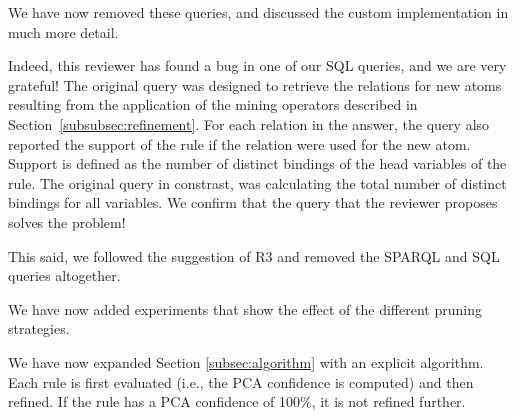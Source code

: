 
We have now removed these queries, and discussed the custom implementation in much more detail.


	  Indeed, this reviewer has found a bug in one of our SQL queries, and we are very grateful! The original query was designed to retrieve the relations for new atoms resulting from the application of the mining operators described in Section~\ref{subsubsec:refinement}. For each relation in the answer, the query also reported the support of the rule if the relation were used for the new atom. Support is defined as the number of distinct bindings of the head variables of the rule. The original query in constrast, was calculating the total number of distinct bindings for all variables. We confirm that the query that the reviewer proposes solves the problem!  

	  This said, we followed the suggestion of R3 and removed the SPARQL and SQL queries altogether.


We have now added experiments that show the effect of the different pruning  strategies.


We have now expanded Section \ref{subsec:algorithm}	with an explicit algorithm. Each rule is first evaluated (i.e., the PCA confidence is computed) and then refined. If the rule has a PCA confidence of 100\%, it is not  refined further.

